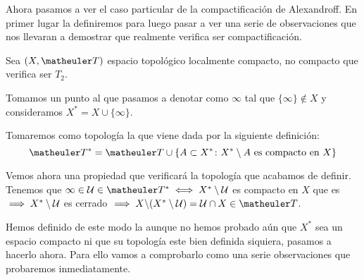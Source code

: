 Ahora pasamos a ver el caso particular de la compactificación de Alexandroff. En primer lugar la definiremos para luego pasar a ver una serie de observaciones que nos llevaran a demostrar que realmente verifica ser compactificación.
\begin{defi}
	Sea $(X,\T)$ espacio topológico localmente compacto, no compacto que verifica ser $T_2$.
	
	Tomamos un punto al que pasamos a denotar como $\infty$ tal que  $\{\infty\}\notin X$ y consideramos $X^*=X\cup\{\infty\}$. 
	
	Tomaremos como  topología la que viene dada por la siguiente definición:
	\begin{equation}
	\T ^* = \T \cup \{A \subset X^* \colon X^*\setminus A \textup{ es compacto en }X\}
	\end{equation}
	
	Vemos ahora una propiedad que verificará la topología que acabamos de definir. Tenemos que  $\infty\in\U\in\T^* \sii X^*\setminus\U$ es compacto en $X$ que es \hausdorff $\implies X^*\setminus\mathcal{U}$ es cerrado $\ra X\backslash(X^*\setminus\U)=\U\cap X\in\T$.
\end{defi}
Hemos definido de este modo la  aunque no hemos probado aún que $X^*$ sea un espacio compacto ni que su topología este bien definida siquiera, pasamos a hacerlo ahora. Para ello vamos a comprobarlo como una serie observaciones que probaremos inmediatamente.

